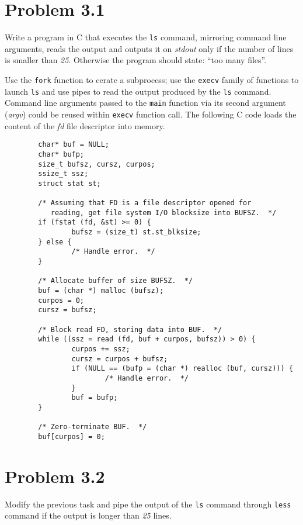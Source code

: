 \documentclass[a4paper,10pt]{scrartcl}
\begin{document}
    \section{Problem 3.1}
    Write a program in C that executes the \verb|ls| command, mirroring command line arguments,
    reads the output and outputs it on \textit{stdout} only if the number of lines is smaller
    than \textit{25}.  Otherwise the program should state: ``too many files''.

    Use the \verb|fork| function to cerate a subprocess; use the \verb|execv| family of functions
    to launch \verb|ls| and use pipes to read the output produced by the \verb|ls| command.  
    Command line arguments passed to the \verb|main| function via its second argument (\textit{argv})
    could be reused within \verb|execv| function call.  The following C code loads the content of
    the \textit{fd} file descriptor into memory.
{\small
\begin{verbatim}
        char* buf = NULL;
        char* bufp;
        size_t bufsz, cursz, curpos;
        ssize_t ssz;
        struct stat st;

        /* Assuming that FD is a file descriptor opened for
           reading, get file system I/O blocksize into BUFSZ.  */
        if (fstat (fd, &st) >= 0) {
                bufsz = (size_t) st.st_blksize;
        } else {
                /* Handle error.  */
        }

        /* Allocate buffer of size BUFSZ.  */
        buf = (char *) malloc (bufsz);
        curpos = 0;
        cursz = bufsz;

        /* Block read FD, storing data into BUF.  */
        while ((ssz = read (fd, buf + curpos, bufsz)) > 0) {
                curpos += ssz;
                cursz = curpos + bufsz;
                if (NULL == (bufp = (char *) realloc (buf, cursz))) {
                        /* Handle error.  */
                }
                buf = bufp;
        }

        /* Zero-terminate BUF.  */
        buf[curpos] = 0;
\end{verbatim}
}

    \section{Problem 3.2}
    Modify the previous task and pipe the output of the \verb|ls| command through 
    \verb|less| command if the output is longer than \textit{25} lines.
\end{document}
